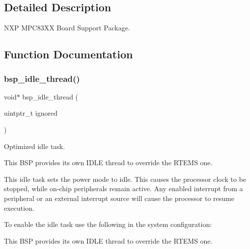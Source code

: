 \subsection{Detailed Description}
N\+XP M\+P\+C83\+XX Board Support Package. 



\subsection{Function Documentation}
\mbox{\label{group__RTEMSBSPsPowerPCGen83XX_ga301be7085b80c41a9c5887247003c662}} 
\subsubsection{\texorpdfstring{bsp\_idle\_thread()}{bsp\_idle\_thread()}}
{\footnotesize\ttfamily void$\ast$ bsp\+\_\+idle\+\_\+thread (\begin{DoxyParamCaption}\item[{uintptr\+\_\+t}]{ignored }\end{DoxyParamCaption})}



Optimized idle task. 

This B\+SP provides its own I\+D\+LE thread to override the R\+T\+E\+MS one.

This idle task sets the power mode to idle. This causes the processor clock to be stopped, while on-\/chip peripherals remain active. Any enabled interrupt from a peripheral or an external interrupt source will cause the processor to resume execution.

To enable the idle task use the following in the system configuration\+:


\begin{DoxyCode}{0}
\DoxyCodeLine{\textcolor{preprocessor}{\#include <bsp.h>}}
\DoxyCodeLine{}
\DoxyCodeLine{\textcolor{preprocessor}{\#define CONFIGURE\_INIT}}
\DoxyCodeLine{}
\DoxyCodeLine{\textcolor{preprocessor}{\#define CONFIGURE\_IDLE\_TASK\_BODY bsp\_idle\_thread}}
\DoxyCodeLine{}
\end{DoxyCode}


This B\+SP provides its own I\+D\+LE thread to override the R\+T\+E\+MS one.

